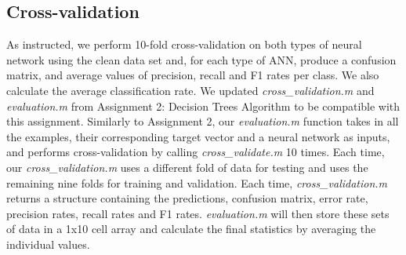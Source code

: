 \documentclass[a4wide, 11pt]{article}
\begin{document}
\subsection{Cross-validation}
As instructed, we perform 10-fold cross-validation on both types of neural network using the clean data set and, for each type of ANN, produce a confusion matrix, and average values of precision, recall and F1 rates per class.  We also calculate the average classification rate.  We updated \textit{cross\_validation.m} and \textit{evaluation.m} from Assignment 2: Decision Trees Algorithm to be compatible with this assignment.  Similarly to Assignment 2, our \textit{evaluation.m} function takes in all the examples, their corresponding target vector and a neural network as inputs, and performs cross-validation by calling \textit{cross\_validate.m}  10 times.  Each time, our \textit{cross\_validation.m} uses a different fold of data for testing and uses the remaining nine folds for training and validation.  Each time,  \textit{cross\_validation.m} returns a structure containing the predictions, confusion matrix, error rate, precision rates, recall rates and F1 rates.   \textit{evaluation.m} will then store these sets of data in a 1x10 cell array and calculate the final statistics by averaging the individual values.
\end{document}
